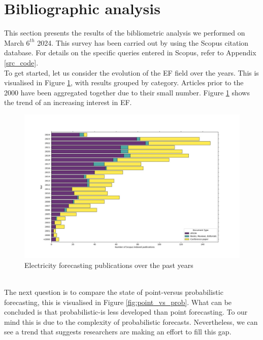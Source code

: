 \section{Bibliographic analysis}
This section presents the results of the bibliometric analysis we performed on March $6^{th}$ 2024. This survey has been carried out by using the Scopus citation database. For details on the specific queries entered in Scopus, refer to Appendix \ref{src_code}.
\\
To get started, let us consider the evolution of the EF field over the years. This is visualised in Figure \ref{fig:epf_evolution}, with results grouped by category. Articles prior to the 2000 have been aggregated together due to their small number. Figure \ref{fig:epf_evolution} shows the trend of an increasing interest in EF.
\begin{figure}
    \includegraphics[width=\textwidth]{images/epf_evolution1.jpg}
    \caption{Electricity forecasting publications over the past years}
    \label{fig:epf_evolution}
  \end{figure}
\\
The next question is to compare the state of point-versus probabilistic forecasting, this is visualised in Figure \ref{fig:point_vs_prob}. What can be concluded is that probabilistic-is less developed than point forecasting. To our mind this is due to the complexity of probabilistic forecasts.
Nevertheless, we can see a trend that suggests researchers are making an effort to fill this gap.
